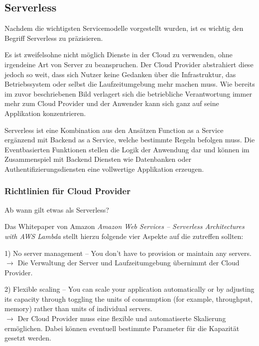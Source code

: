 \subsection{Serverless}
\label{Serverless}
Nachdem die wichtigsten Servicemodelle vorgestellt wurden, ist es wichtig den Begriff Serverless zu präzisieren.


Es ist zweifelsohne nicht möglich Dienste in der Cloud zu verwenden, ohne irgendeine Art von Server zu beanspruchen.
Der Cloud Provider abstrahiert diese jedoch so weit, dass sich Nutzer keine Gedanken über die Infrastruktur, das Betriebssystem oder selbst die Laufzeitumgebung mehr machen muss.
Wie bereits im zuvor beschriebenen Bild verlagert sich die betriebliche Verantwortung immer mehr zum Cloud Provider und der Anwender kann sich ganz auf seine Applikation konzentrieren.

Serverless ist eine Kombination aus den Ansätzen Function as a Service ergänzend mit Backend as a Service, welche bestimmte Regeln befolgen muss.
Die Eventbasierten Funktionen stellen die Logik der Anwendung dar und können im Zusammenspiel mit
Backend Diensten wie Datenbanken oder Authentifizierungsdiensten eine vollwertige Applikation erzeugen.



\subsubsection{Richtlinien für Cloud Provider }

Ab wann gilt etwas als Serverless?

Das Whitepaper von Amazon \textit{Amazon Web Services – Serverless Architectures with AWS Lambda} \cite[Seitenzahl 1]{AWSWhitepaper}
stellt hierzu folgende vier Aspekte auf die zutreffen sollten:

1) \glqq No server management – You don’t have to provision or maintain any servers.\grqq
  \\ $\rightarrow$ Die Verwaltung der Server und Laufzeitumgebung übernimmt der Cloud Provider.

2) \glqq Flexible scaling – You can scale your application automatically or by adjusting its capacity through toggling the units of consumption (for example, throughput, memory) rather than units of individual servers.\grqq
\\ $\rightarrow$ Der Cloud Provider muss eine flexible und automatiserte Skalierung ermöglichen. Dabei können eventuell bestimmte Parameter für die Kapazität gesetzt werden.

